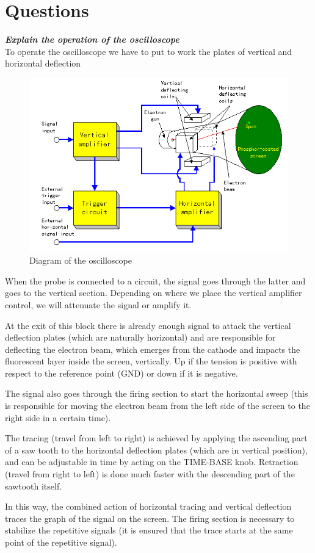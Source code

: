 \documentclass[letterpaper]{article}
\begin{document}
\section{Questions}
\textit{\textbf{Explain the operation of the oscilloscope}}\\
To operate the oscilloscope we have to put to work the plates of vertical and horizontal deflection
\begin{figure}[H]
    \centering
    \includegraphics[width=.4\linewidth]{img/intro/diagram}
    \caption{Diagram of the oscilloscope}
\end{figure}
When the probe is connected to a circuit, the signal goes through the latter and goes to the vertical section. Depending on where we place the vertical amplifier control, we will attenuate the signal or amplify it.

At the exit of this block there is already enough signal to attack the vertical deflection plates (which are naturally horizontal) and are responsible for deflecting the electron beam, which emerges from the cathode and impacts the fluorescent layer inside the screen, vertically. Up if the tension is positive with respect to the reference point (GND) or down if it is negative.

The signal also goes through the firing section to start the horizontal sweep (this is responsible for moving the electron beam from the left side of the screen to the right side in a certain time).

The tracing (travel from left to right) is achieved by applying the ascending part of a saw tooth to the horizontal deflection plates (which are in vertical position), and can be adjustable in time by acting on the TIME-BASE knob. Retraction (travel from right to left) is done much faster with the descending part of the sawtooth itself.

In this way, the combined action of horizontal tracing and vertical deflection traces the graph of the signal on the screen. The firing section is necessary to stabilize the repetitive signals (it is ensured that the trace starts at the same point of the repetitive signal).
\end{document}
